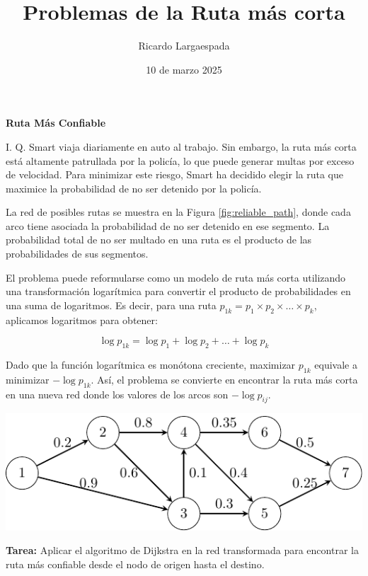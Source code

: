 \documentclass{article}
\title{Problemas de la Ruta más corta}
\author{Ricardo Largaespada}
\date{10 de marzo 2025}
\begin{document}
\maketitle

\begin{problem}\textbf{Ruta Más Confiable}

I. Q. Smart viaja diariamente en auto al trabajo. Sin embargo, la ruta más corta está altamente patrullada por la policía, lo que puede generar multas por exceso de velocidad. Para minimizar este riesgo, Smart ha decidido elegir la ruta que maximice la probabilidad de no ser detenido por la policía.

La red de posibles rutas se muestra en la Figura \ref{fig:reliable_path}, donde cada arco tiene asociada la probabilidad de no ser detenido en ese segmento. La probabilidad total de no ser multado en una ruta es el producto de las probabilidades de sus segmentos. 

El problema puede reformularse como un modelo de ruta más corta utilizando una transformación logarítmica para convertir el producto de probabilidades en una suma de logaritmos. Es decir, para una ruta \( p_{1k} = p_1 \times p_2 \times \dots \times p_k \), aplicamos logaritmos para obtener:

\[
\log p_{1k} = \log p_1 + \log p_2 + \dots + \log p_k
\]

Dado que la función logarítmica es monótona creciente, maximizar \( p_{1k} \) equivale a minimizar \( -\log p_{1k} \). Así, el problema se convierte en encontrar la ruta más corta en una nueva red donde los valores de los arcos son \( -\log p_{ij} \).

\begin{center}
    \includegraphics[scale=1]{images/reliable_path.pdf}
    \label{fig:reliable_path}
\end{center}


\textbf{Tarea:} Aplicar el algoritmo de Dijkstra en la red transformada para encontrar la ruta más confiable desde el nodo de origen hasta el destino.
\end{problem}
\end{document}
